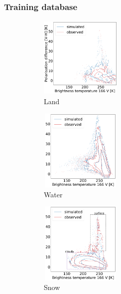 \documentclass[12pt,oneside,a4paper]{article}
\begin{document}


\subsubsection{Training database}
%
\begin{figure}[t]
	\centering
	\begin{subfigure}{.24\textwidth}
		\caption{Land}
		\includegraphics[height=39mm, width = 39mm]{Figures/hist2d_gmi_45-65_land.pdf}
	\end{subfigure}
	\begin{subfigure}{.24\textwidth}
		\caption{Water}
		\includegraphics[height = 39mm, width = 39mm]{Figures/hist2d_gmi_45-60_sea.pdf}
	\end{subfigure}
	\begin{subfigure}{.24\textwidth}
	\caption{Snow}
	\includegraphics[height = 39mm, width = 39mm]{Figures/hist2d_gmi_45-60_snow.pdf}
\end{subfigure}
\begin{subfigure}{.24\textwidth}

\end{subfigure}
\end{figure}
\end{document}
